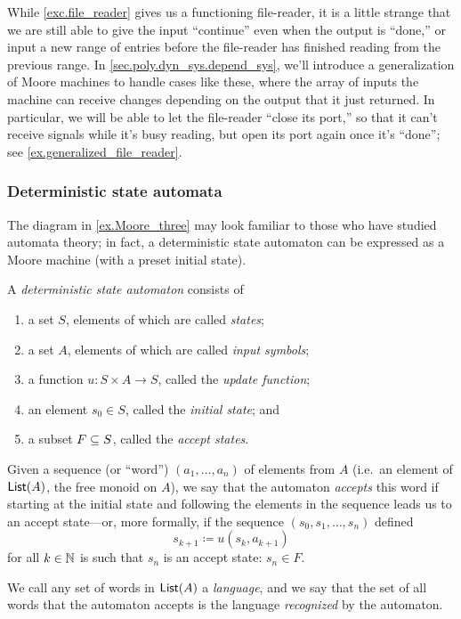 \documentclass[Book-Poly]{subfiles}
\begin{document}
While \cref{exc.file_reader} gives us a functioning file-reader, it is a little strange that we are still able to give the input ``continue'' even when the output is ``done,'' or input a new range of entries before the file-reader has finished reading from the previous range.
In \cref{sec.poly.dyn_sys.depend_sys}, we'll introduce a generalization of Moore machines to handle cases like these, where the array of inputs the machine can receive changes depending on the output that it just returned.
In particular, we will be able to let the file-reader ``close its port,'' so that it can't receive signals while it's busy reading, but open its port again once it's ``done''; see \cref{ex.generalized_file_reader}.

\subsubsection{Deterministic state automata}

The diagram in \cref{ex.Moore_three} may look familiar to those who have studied automata theory; in fact, a deterministic state automaton can be expressed as a Moore machine (with a preset initial state).

\begin{definition}\label{def.dfa}
A \emph{deterministic state automaton} consists of
\begin{enumerate}
	\item a set $S$, elements of which are called \emph{states};
	\item a set $A$, elements of which are called \emph{input symbols};
	\item a function $u\colon S\times A\to S$, called the \emph{update function};
	\item an element $s_0\in S$, called the \emph{initial state}; and
	\item a subset $F\ss S$, called the \emph{accept states}.
\end{enumerate}
Given a sequence (or ``word'') $(a_1,\ldots,a_n)$ of elements from $A$ (i.e.\ an element of $\lst(A)$, the free monoid on $A$), we say that the automaton \emph{accepts} this word if starting at the initial state and following the elements in the sequence leads us to an accept state---or, more formally, if the sequence $(s_0,s_1,\ldots,s_n)$ defined
\[
    s_{k+1}\coloneqq u(s_k,a_{k+1})
\]
for all $k\in\nn$ is such that $s_n$ is an accept state: $s_n\in F$.

We call any set of words in $\lst(A)$ a \emph{language}, and we say that the set of all words that the automaton accepts is the language \emph{recognized} by the automaton.
\end{definition}
\end{document}
